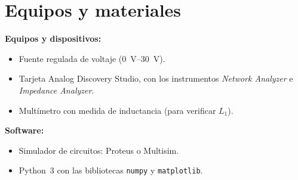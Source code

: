 \documentclass[11pt,a4paper]{article}
\begin{document}
\section{Equipos y materiales}
\noindent\textbf{Equipos y dispositivos:}
\begin{itemize}
    \item Fuente regulada de voltaje (\qtyrange{0}{30}{\volt}).
    \item Tarjeta Analog Discovery Studio, con los instrumentos \emph{Network
          Analyzer} e \emph{Impedance Analyzer}.
    \item Multímetro con medida de inductancia (para verificar $L_1$).
\end{itemize}

\noindent\textbf{Software:}
\begin{itemize}
    \item Simulador de circuitos: Proteus o Multisim.
    \item Python~3 con las bibliotecas \texttt{numpy} y \texttt{matplotlib}.
\end{itemize}
\end{document}
